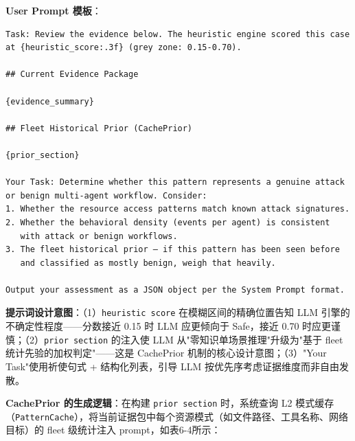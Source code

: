 \documentclass[a4paper]{ctexart}
\makeatletter
\renewcommand{\_}{%
  \ifmmode
    \nfss@text{\textunderscore}%
  \else
    \textunderscore\discretionary{}{}{}%
  \fi}
\makeatother
\begin{document}
\textbf{User Prompt 模板}：


\begin{lstlisting}
Task: Review the evidence below. The heuristic engine scored this case
at {heuristic_score:.3f} (grey zone: 0.15-0.70).

## Current Evidence Package

{evidence_summary}

## Fleet Historical Prior (CachePrior)

{prior_section}

Your Task: Determine whether this pattern represents a genuine attack
or benign multi-agent workflow. Consider:
1. Whether the resource access patterns match known attack signatures.
2. Whether the behavioral density (events per agent) is consistent
   with attack or benign workflows.
3. The fleet historical prior — if this pattern has been seen before
   and classified as mostly benign, weigh that heavily.

Output your assessment as a JSON object per the System Prompt format.
\end{lstlisting}


\textbf{提示词设计意图}：（1）\texttt{{heuristic\_score}} 在模糊区间的精确位置告知 LLM 引擎的不确定性程度——分数接近 0.15 时 LLM 应更倾向于 Safe，接近 0.70 时应更谨慎；（2）\texttt{{prior\_section}} 的注入使 LLM 从"零知识单场景推理"升级为"基于 fleet 统计先验的加权判定"——这是 CachePrior 机制的核心设计意图；（3）"Your Task"使用祈使句式 + 结构化列表，引导 LLM 按优先序考虑证据维度而非自由发散。


\textbf{CachePrior 的生成逻辑}：在构建 \texttt{prior\_section} 时，系统查询 L2 模式缓存（\texttt{PatternCache}），将当前证据包中每个资源模式（如文件路径、工具名称、网络目标）的 fleet 级统计注入 prompt，如表6-4所示：
\end{document}
